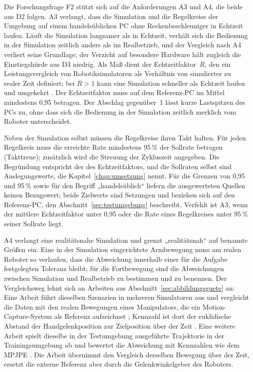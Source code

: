 Die Forschungsfrage F2 stützt sich auf die Anforderungen A3 und A4, die beide aus D2 folgen.
A3 verlangt, dass die Simulation und die Regelkreise der Umgebung auf einem handelsüblichen PC ohne Rechenbeschleuniger in Echtzeit laufen.
Läuft die Simulation langsamer als in Echtzeit, verhält sich die Bedienung in der Simulation zeitlich anders als im Realbetrieb, und der Vergleich nach A4 verliert seine Grundlage; der Verzicht auf besondere Hardware hält zugleich die Einstiegshürde aus D3 niedrig.
Als Maß dient der Echtzeitfaktor~$R$, den ein Leistungsvergleich von Robotiksimulatoren als Verhältnis von simulierter zu realer Zeit definiert; bei $R > 1$ kann eine Simulation schneller als Echtzeit laufen und umgekehrt \cite{Pitonakova2018}.
Der Echtzeitfaktor muss auf dem Referenz-PC im Mittel mindestens 0,95 betragen. %
Der Abschlag gegenüber~1 lässt kurze Lastspitzen des PCs zu, ohne dass sich die Bedienung in der Simulation zeitlich merklich vom Roboter unterscheidet.

Neben der Simulation selbst müssen die Regelkreise ihren Takt halten.
Für jeden Regelkreis muss die erreichte Rate mindestens 95\,\% der Sollrate betragen (Takttreue); zusätzlich wird die Streuung der Zykluszeit angegeben. %
Die Begründung entspricht der des Echtzeitfaktors, und die Sollraten selbst sind Auslegungswerte, die Kapitel~\ref{chap:umsetzung} nennt.
Für die Grenzen von 0,95 und 95\,\% sowie für den Begriff „handelsüblich“ liefern die ausgewerteten Quellen keinen Bezugswert; beide Zielwerte sind Setzungen und beziehen sich auf den Referenz-PC, den Abschnitt~\ref{sec:testumgebung} beschreibt.
Verfehlt ist A3, wenn der mittlere Echtzeitfaktor unter 0,95 oder die Rate eines Regelkreises unter 95\,\% seiner Sollrate liegt.

A4 verlangt eine realitätsnahe Simulation und grenzt „realitätsnah“ auf benannte Größen ein.
Eine in der Simulation eingerichtete Armbewegung muss am realen Roboter so verlaufen, dass die Abweichung innerhalb einer für die Aufgabe festgelegten Toleranz bleibt; für die Fortbewegung sind die Abweichungen zwischen Simulation und Realbetrieb zu bestimmen und zu benennen.
Der Vergleichsweg lehnt sich an Arbeiten aus Abschnitt~\ref{sec:abbildungsguete} an: Eine Arbeit führt dieselben Szenarien in mehreren Simulatoren aus und vergleicht die Daten mit den realen Bewegungen eines Manipulators, die ein Motion-Capture-System als Referenz aufzeichnet \cite{Collins2019}; Kennzahl ist dort der euklidische Abstand der Handgelenkposition zur Zielposition über der Zeit \cite{Collins2019}.
Eine weitere Arbeit spielt dieselbe in der Testumgebung ausgeführte Trajektorie in der Trainingsumgebung ab und bewertet die Abweichung mit Kennzahlen wie dem MPJPE \cite{He2025}.
Die Arbeit übernimmt den Vergleich derselben Bewegung über der Zeit, ersetzt die externe Referenz aber durch die Gelenkwinkelgeber des Roboters.

